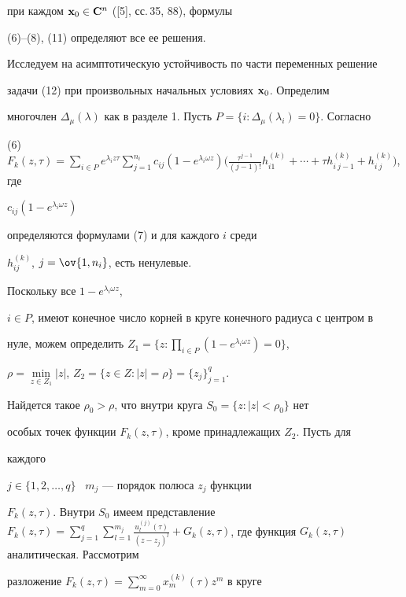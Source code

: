 при каждом $\bold x_0\in\bold C^n$ ([5], сс.\,35, 88), формулы


(6)--(8), (11) определяют все ее решения. 


 


Исследуем на асимптотическую устойчивость по части переменных решение 


задачи (12) при произвольных начальных условиях $\bold x_0$. Определим 


многочлен $\Delta_\mu(\lambda)$ как в разделе 1. Пусть $P=\{i:\Delta_\mu 


(\lambda_i)=0\}$. Согласно 


(6) \ $F_k(z,\tau)=\sum\limits_{i\in P} e^{\lambda_i z\tau} 


\sum\limits^{n_i}_{j=1}c_{ij}(1-e^{\lambda_i\omega z})


\big(\frac{\tau^{j-1}}{(j-1)!} 


h^{(k)}_{i1}+\dotsb+\tau h^{(k)}_{i\ j-1}+h^{(k)}_{i\ j}\big)$, где 


$c_{ij}(1-e^{\lambda_i\omega z})$


определяются формулами (7) и для каждого $i$ среди 


$h^{(k)}_{ij}$, $j=\ov{1,n_i}$, есть ненулевые.


Поскольку все $1-e^{\lambda_i\omega z}$, 


$i\in P$, имеют конечное число корней в круге конечного радиуса с центром в 


нуле, можем определить $Z_1=\Big\{z: \prod\limits_{i\in P}


(1-e^{\lambda_i\omega z})=0\Big\}$, 


$\rho=\min\limits_{z\in Z_1}|z|$, $Z_2=\{z\in Z:|z|=\rho\}=\{z_j\}^q_{j=1}$. 


Найдется такое $\rho_0>\rho$, что внутри круга $S_0=\{z:|z|<\rho_0\}$ нет 


особых точек функции $F_k(z,\tau)$, кроме принадлежащих $Z_2$. Пусть для 


каждого 


$j\in\{1,2,\dotsc,q\}$ \ $m_j$ --- порядок полюса $z_j$ функции 


$F_k(z,\tau)$. Внутри $S_0$ имеем представление $F_k(z,\tau)= 


\sum\limits^q_{j=1}\sum\limits^{m_j}_{l=1} \frac{u^{(j)}_l(\tau)} 


{(z-z_j)^l}+G_k(z,\tau)$, где функция $G_k(z,\tau)$ аналитическая. Рассмотрим 


разложение $F_k(z,\tau)=\sum\limits^\infty_{m=0} x^{(k)}_m(\tau)z^m$ в круге 


